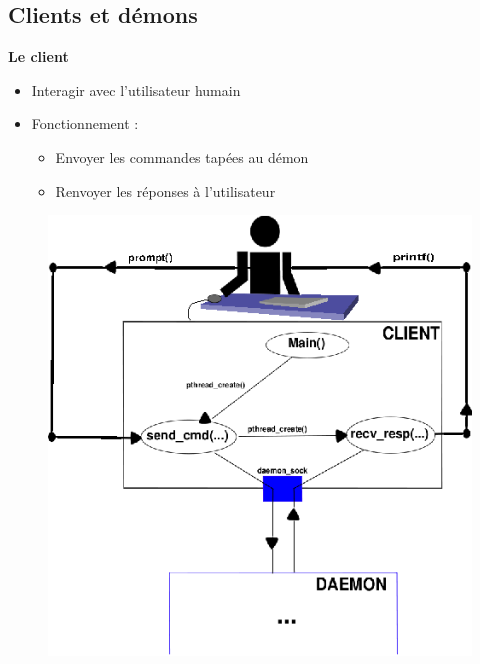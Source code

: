 \documentclass{beamer}
\begin{document}
\begin{frame}
    \section{Clients et démons}
     \textbf{Le client}

    \begin{itemize}
        \item Interagir avec l'utilisateur humain
        \item Fonctionnement : 
            \begin{itemize}
                \item Envoyer les commandes tapées au démon
                \item Renvoyer les réponses à l'utilisateur
            \end{itemize}
    \end{itemize}
\begin{center}
\begin{figure}[htbp]
    \centering
    \includegraphics[scale=0.8]{archi_client.eps}
\end{figure}
\end{center}


\end{frame}
\end{document}

